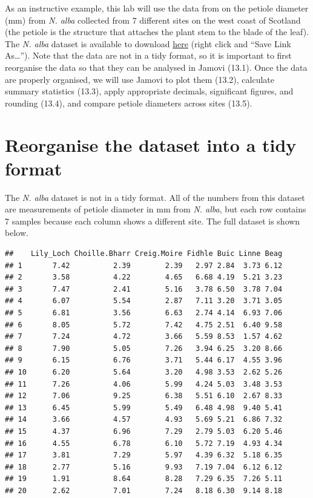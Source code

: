 \documentclass[
]{scrbook}
\begin{document}
As an instructive example, this lab will use the data from \citet{Law2014} on the petiole diameter (mm) from \emph{N. alba} collected from 7 different sites on the west coast of Scotland (the petiole is the structure that attaches the plant stem to the blade of the leaf).
The \emph{N. alba} dataset is available to download \href{https://raw.githubusercontent.com/bradduthie/SCIU4T4/main/data/Nymphaea_alba.csv}{here} (right click and ``Save Link As\ldots{}'').
Note that the data are not in a tidy format, so it is important to first reorganise the data so that they can be analysed in Jamovi (13.1).
Once the data are properly organised, we will use Jamovi to plot them (13.2), calculate summary statistics (13.3), apply appropriate decimals, significant figures, and rounding (13.4), and compare petiole diameters across sites (13.5).

\hypertarget{reorganise-the-dataset-into-a-tidy-format}{%
\section{Reorganise the dataset into a tidy format}\label{reorganise-the-dataset-into-a-tidy-format}}

The \emph{N. alba} dataset is not in a tidy format.
All of the numbers from this dataset are measurements of petiole diameter in mm from \emph{N. alba}, but each row contains 7 samples because each column shows a different site.
The full dataset is shown below.

\begin{verbatim}
##    Lily_Loch Choille.Bharr Creig.Moire Fidhle Buic Linne Beag
## 1       7.42          2.39        2.39   2.97 2.84  3.73 6.12
## 2       3.58          4.22        4.65   6.68 4.19  5.21 3.23
## 3       7.47          2.41        5.16   3.78 6.50  3.78 7.04
## 4       6.07          5.54        2.87   7.11 3.20  3.71 3.05
## 5       6.81          3.56        6.63   2.74 4.14  6.93 7.06
## 6       8.05          5.72        7.42   4.75 2.51  6.40 9.58
## 7       7.24          4.72        3.66   5.59 8.53  1.57 4.62
## 8       7.90          5.05        7.26   3.94 6.25  3.20 8.66
## 9       6.15          6.76        3.71   5.44 6.17  4.55 3.96
## 10      6.20          5.64        3.20   4.98 3.53  2.62 5.26
## 11      7.26          4.06        5.99   4.24 5.03  3.48 3.53
## 12      7.06          9.25        6.38   5.51 6.10  2.67 8.33
## 13      6.45          5.99        5.49   6.48 4.98  9.40 5.41
## 14      3.66          4.57        4.93   5.69 5.21  6.86 7.32
## 15      4.37          6.96        7.29   2.79 5.03  6.20 5.46
## 16      4.55          6.78        6.10   5.72 7.19  4.93 4.34
## 17      3.81          7.29        5.97   4.39 6.32  5.18 6.35
## 18      2.77          5.16        9.93   7.19 7.04  6.12 6.12
## 19      1.91          8.64        8.28   7.29 6.35  7.26 5.11
## 20      2.62          7.01        7.24   8.18 6.30  9.14 8.18
\end{verbatim}
\end{document}
